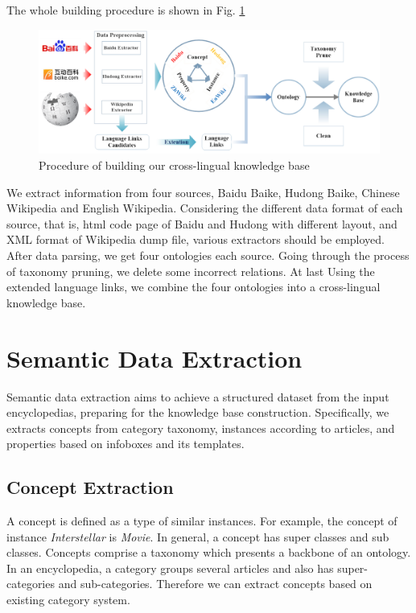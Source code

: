 \documentclass[runningheads,a4paper]{llncs}
\begin{document}
The whole building procedure is shown in Fig. \ref{fig:procedure}
\begin{figure}[ht]
    \centerline{\includegraphics[width=1\columnwidth]{fig/procedure}}
    \caption{Procedure of building our cross-lingual knowledge base}
    \label{fig:procedure}
\end{figure}%
We extract information from four sources, Baidu Baike, Hudong Baike, Chinese Wikipedia and English Wikipedia. Considering the different data format of each source, that is, html code page of Baidu and Hudong with different layout, and XML format of Wikipedia dump file, various extractors should be employed. After data parsing, we get four ontologies each source. Going through the process of taxonomy pruning, we delete some incorrect relations. At last Using the extended language links, we combine the four ontologies into a cross-lingual knowledge base.

\section{Semantic Data Extraction}
\label{sec:dp}
Semantic data extraction aims to achieve a structured dataset from the input encyclopedias, preparing for the knowledge base construction. Specifically, we extracts concepts from category taxonomy, instances according to articles, and properties based on infoboxes and its templates.

\subsection{Concept Extraction}
\label{sec:ce}
A concept is defined as a type of similar instances. For example, the concept of instance \emph{Interstellar} is \emph{Movie}. In general, a concept has super classes and sub classes. Concepts comprise a taxonomy which presents a backbone of an ontology. In an encyclopedia, a category groups several articles and also has super-categories and sub-categories. Therefore we can extract concepts based on existing category system.
\end{document}
